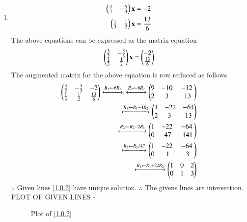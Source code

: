 \documentclass[journal,12pt,twocolumn]{IEEEtran}
\begin{document}
\begin{enumerate}
\begin{figure}[ht!]
\end{figure} 
\item
\begin{align}
\begin{split}
\begin{pmatrix}\frac{3}{2} & -\frac{5}{3} \end{pmatrix}\mathbf{x}&=-2
\\
\begin{pmatrix}\frac{1}{3} & \frac{1}{2}\end{pmatrix}\mathbf{x}&=\frac {13}{6}
\end{split}
\end{align}
The above equations can be expressed as the matrix equation
\begin{align}
\begin{pmatrix}\frac{3}{2} & -\frac {5}{3}\\\frac{1}{3} & \frac{1}{2}\end{pmatrix} \mathbf{x} = \begin{pmatrix}-2\\\frac{13}{6}\end{pmatrix}
\end{align}
%
The augmented matrix for the above equation is row reduced as follows\begin{align}
\myvec{\frac{3}{2} & -\frac{5}{3} & -2\\\frac{1}{3} &\frac{1}{2} & \frac{13}{6}}
\xleftrightarrow {R_1\leftarrow 6R_1},\xleftrightarrow {R_2 \leftarrow 6R_2}\myvec{9 & -10 & -12 \\2 & 3 & 13}
\\
\xleftrightarrow {R_1\leftarrow R_1- 4R_2}\myvec{1 & -22 & -64\\2 & 3 & 13}
\\
\xleftrightarrow {R_2\leftarrow R_2-2R_1}\myvec{1 & -22 & -64 \\0 & 47& 141}
\\
\xleftrightarrow {R_2\leftarrow R_2/47}\myvec{1 & -22 & -64 \\0 & 1 & 3}
\\
\xleftrightarrow {R_1 \leftarrow R_1+22R_2}\myvec {1 & 0 & 2\\0 & 1 & 3}
\end{align}
$\therefore$ Given lines \eqref{1.0.2} have unique solution.
$\therefore$ The givens lines are intersection. 
PLOT OF GIVEN LINES -
\begin{figure}[!ht]
Plot of \eqref{1.0.2} 
    \centering

\end{figure}
\end{enumerate}
\end{document}
